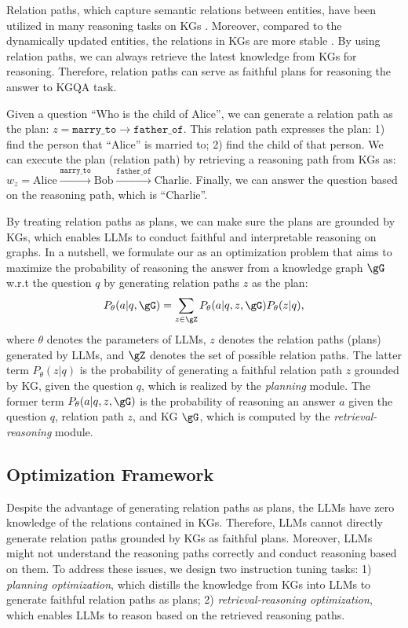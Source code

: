 Relation paths, which capture semantic relations between entities, have been utilized in many reasoning tasks on KGs \citep{wang2021relational,xusubgraph}. Moreover, compared to the dynamically updated entities, the relations in KGs are more stable \citep{wang2023survey}. By using relation paths, we can always retrieve the latest knowledge from KGs for reasoning. Therefore, relation paths can serve as faithful plans for reasoning the answer to KGQA task.
\begin{example}
    Given a question ``Who is the child of Alice'', we can generate a relation path as the plan: $z=\texttt{marry\_to} \to \texttt{father\_of}$. This relation path expresses the plan: 1) find the person that ``Alice'' is married to; 2) find the child of that person.
    We can execute the plan (relation path) by retrieving a reasoning path from KGs as: $w_z=\text{Alice}\xrightarrow{\texttt{marry\_to}}\text{Bob}\xrightarrow{\texttt{father\_of}}\text{Charlie}$. Finally, we can answer the question based on the reasoning path, which is ``Charlie''.
\end{example}

By treating relation paths as plans, we can make sure the plans are grounded by KGs, which enables LLMs to conduct faithful and interpretable reasoning on graphs. In a nutshell, we formulate our \ourmethod as an optimization problem that aims to maximize the probability of reasoning the answer from a knowledge graph $\gG$ w.r.t the question $q$ by generating relation paths $z$ as the plan:
\begin{equation}
    \setlength\abovedisplayskip{1pt}%
    \setlength\belowdisplayskip{1pt}
    \label{eq:plan}
    P_\theta(a|q,\gG) = \sum_{z\in\gZ}P_\theta(a|q,z,\gG)P_\theta(z|q),
\end{equation}
where $\theta$ denotes the parameters of LLMs, $z$ denotes the relation paths (plans) generated by LLMs, and $\gZ$ denotes the set of possible relation paths. The latter term $P_\theta(z|q)$ is the probability of generating a faithful relation path $z$ grounded by KG, given the question $q$, which is realized by the \textit{planning} module. The former term $P_\theta(a|q,z,\gG)$ is the probability of reasoning an answer $a$ given the question $q$, relation path $z$, and KG $\gG$, which is computed by the \textit{retrieval-reasoning} module.

\subsection{Optimization Framework}
Despite the advantage of generating relation paths as plans, the LLMs have zero knowledge of the relations contained in KGs. Therefore, LLMs cannot directly generate relation paths grounded by KGs as faithful plans. Moreover, LLMs might not understand the reasoning paths correctly and conduct reasoning based on them. To address these issues, we design two instruction tuning tasks: 1) \textit{planning optimization}, which distills the knowledge from KGs into LLMs to generate faithful relation paths as plans; 2) \textit{retrieval-reasoning optimization}, which enables LLMs to reason based on the retrieved reasoning paths.

